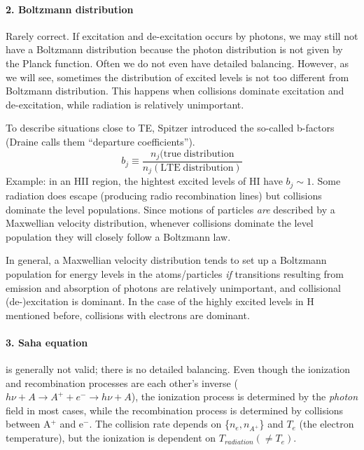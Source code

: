 \documentclass[12pt]{article}
\newcommand{\mar}[1]{\hspace{0pt}\marginpar{-\textcolor{black}{#1}-}}
\begin{document}
\paragraph{2. Boltzmann distribution}
\mar{21}Rarely correct.
If excitation and de-excitation occurs by photons, we may still not have a
Boltzmann distribution because the photon distribution is not given by the
Planck function. Often we do not even have detailed balancing.
However, as we will see, sometimes the distribution of excited levels
is not too different from Boltzmann distribution. This happens when collisions
dominate excitation and de-excitation, while radiation is relatively unimportant.

To describe situations close to TE, Spitzer introduced the so-called
b-factors (Draine calls them ``departure coefficients'').
\[
    b_{j} \equiv
    \frac{n_{j}(\mathrm{true\; distribution}}{n_{j}(\mathrm{LTE\; distribution})}
    \]
Example: in an HII region, the hightest excited levels of HI have $b_{j} \sim 1$.
Some radiation does escape (producing radio recombination lines) but collisions
dominate the level populations. Since motions of particles \emph{are} described
by a Maxwellian velocity distribution, whenever collisions dominate the level
population they will closely follow a Boltzmann law.

\mar{22}In general, a Maxwellian velocity distribution tends to set up a
Boltzmann population for energy levels in the atoms/particles \emph{if}
transitions resulting from emission and absorption of photons are
relatively unimportant, and collisional (de-)excitation is dominant. In the
case of the highly excited levels in H mentioned before, collisions with
electrons are dominant.

\paragraph{3. Saha equation} is generally not valid; there is no detailed
balancing. Even though the ionization and recombination processes are
each other's inverse
\newline
($h\nu + A \rightarrow A^{+} + e^{-} \rightarrow h\nu + A$),
\newline
the ionization process is determined by the \emph{photon} field in most
cases, while the recombination process is determined by collisions between
A$^{+}$ and e$^{-}$. The collision rate depends on \{$n_{e}, n_{A^{+}}$\}
and $T_{e}$ (the electron temperature), but the ionization is dependent on
$T_{radiation} (\neq T_{e})$.
\end{document}
